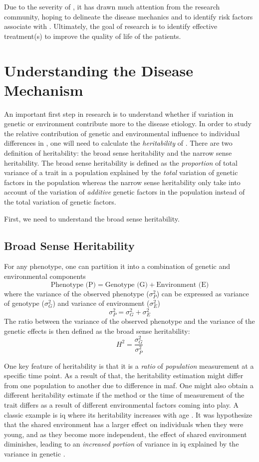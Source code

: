 \documentclass[12pt]{scrbook}
\newcommand*{\glng}{\glsentrylong}
\begin{document}
	Due to the severity of \glng{scz}, it has drawn much attention from the research community, hoping to delineate the disease mechanics and to identify risk factors associate with \glng{scz}.
	Ultimately, the goal of \glng{scz} research is to identify effective treatment(s) to improve the quality of life of the patients.
	
	\section{Understanding the Disease Mechanism}
	An important first step in \glng{scz} research is to understand whether if variation in genetic or environment contribute more to the disease etiology.
	In order to study the relative contribution of genetic and environmental influence to individual differences in \glng{scz}, one will need to calculate the \emph{heritability} of \glng{scz}.
	There are two definition of heritability: the broad sense heritability and the narrow sense heritability.
	The broad sense heritability is defined as the \emph{proportion} of total variance of a trait in a population explained by the \emph{total} variation of genetic factors in the population whereas the narrow sense heritability only take into account of the variation of \emph{additive} genetic factors in the population instead of the total variation of genetic factors.
	
	First, we need to understand the broad sense heritability.
	\subsection{Broad Sense Heritability}
	For any phenotype, one can partition it into a combination of genetic and environmental components \citep{Falconer1996}
	$$
	\text{Phenotype (P)}=\text{Genotype (G)}+\text{Environment (E)}
	$$
	where the variance of the observed phenotype ($\sigma_P^2$) can be expressed as variance of genotype ($\sigma_G^2$) and variance of environment ($\sigma_E^2$)
	$$
	\sigma_P^2=\sigma_G^2+\sigma_E^2
	$$
	The ratio between the variance of the observed phenotype and the variance of the genetic effects is then defined as the broad sense heritability:
	$$
	H^2=\frac{\sigma_G^2}{\sigma_P^2}
	$$
	
	One key feature of heritability is that it is a \emph{ratio} of \emph{population} measurement at a specific time point.
	As a result of that, the heritability estimation might differ from one population to another due to difference in \gls{maf}.
	One might also obtain a different heritability estimate if the method or the time of measurement of the trait differs as a result of different environmental factors coming into play.
	A classic example is \gls{iq} where its heritability increases with age \citep{Bouchard2013}.
	It was hypothesize that the shared environment has a larger effect on individuals when they were young, and as they become more independent, the effect of shared environment diminishes, leading to an \emph{increased portion} of variance in \gls{iq} explained by the variance in genetic \citep{Bouchard2013}. 
	
\end{document}
